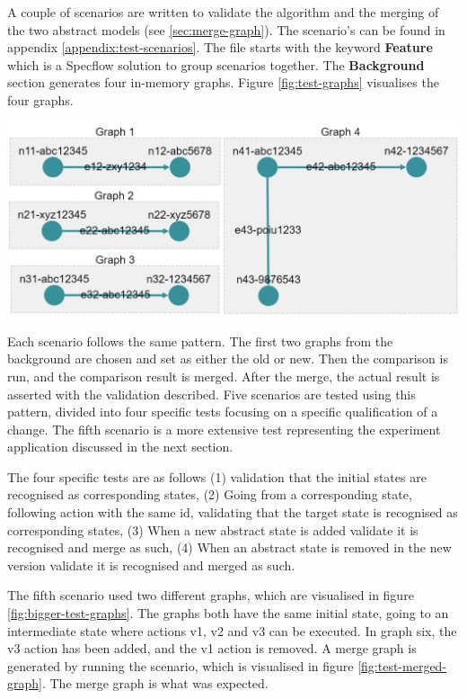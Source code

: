 A couple of scenarios are written to validate the algorithm and the merging of the two abstract models (see \ref{sec:merge-graph}). The scenario's can be found in appendix \ref{appendix:test-scenarios}. The file starts with the keyword \textbf{Feature} which is a Specflow solution to group scenarios together. The \textbf{Background} section generates four in-memory graphs. Figure \ref{fig:test-graphs} visualises the four graphs. 

\begingroup
\captionsetup{type=figure}
\includegraphics[scale=0.6]{images/6-TestGraphs.png}
\label{fig:test-graphs}
\endgroup

Each scenario follows the same pattern. The first two graphs from the background are chosen and set as either the old or new. Then the comparison is run, and the comparison result is merged. After the merge, the actual result is asserted with the validation described. Five scenarios are tested using this pattern, divided into four specific tests focusing on a specific qualification of a change. The fifth scenario is a more extensive test representing the experiment application discussed in the next section.


The four specific tests are as follows (1) validation that the initial states are recognised as corresponding states, (2) Going from a corresponding state, following action with the same id, validating that the target state is recognised as corresponding states, (3) When a new abstract state is added validate it is recognised and merge as such, (4) When an abstract state is removed in the new version validate it is recognised and merged as such.

The fifth scenario used two different graphs, which are visualised in figure \ref{fig:bigger-test-graphs}. The graphs both have the same initial state, going to an intermediate state where actions v1, v2 and v3 can be executed. In graph six, the v3 action has been added, and the v1 action is removed. A merge graph is generated by running the scenario, which is visualised in figure \ref{fig:test-merged-graph}. The merge graph is what was expected. 

